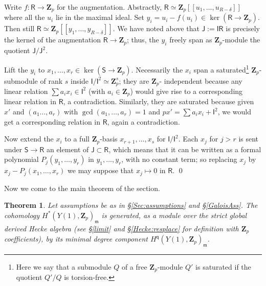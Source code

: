 \documentclass[10pt]{amsart}
\newcommand{\Z}{\mathbf{Z}}
\newcommand{\Jinf}{\mathsf{J}}
\newcommand{\Sinf}{\mathsf{S}}
\newcommand{\Iinf}{\mathsf{I}}
\newcommand{\Rinf}{\mathsf{R}}
\newtheorem{theorem}[subsection]{Theorem}
\theoremstyle{remark}
\newcommand{\BWq}{\mathsf{q}}
\begin{document}
\proof 
  
 
 Write $f: \Rinf \rightarrow \Z_p$ for the augmentation. 
  Abstractly, $\Rinf \simeq \Z_p[[u_1, \dots, u_{R-{\delta}}]]$ where all the $u_i$ lie in the maximal ideal.  
Set  $y_i = u_i - f(u_i) \in  \ker(\Rinf \rightarrow \Z_p)$. Then still $\Rinf \simeq \Z_p[[y_1, \dots, y_{R-\delta}]]$. 
We have noted above that $\Jinf := \Iinf \Rinf$ is precisely the kernel of the augmentation $\Rinf \rightarrow \Z_p$; thus, 
  the $y_i$ freely span as $\Z_p$-module the quotient $\Jinf/\Jinf^2$.  
 
 Lift the $y_i$ to $x_1, \dots, x_r \in \ker(\Sinf \rightarrow \Z_p)$. 
Necessarily the $x_i$  span a saturated\footnote{Here we say that a submodule $Q$ of a free $\Z_p$-module $Q'$ is saturated if the quotient
$Q'/Q$ is torsion-free.} $\Z_p$-submodule of rank $s$ inside $\Iinf/\Iinf^2 \simeq \Z_p^s$; 
they are $\Z_p$- independent because any linear relation $\sum a_i x_i \in \Iinf^2$ (with $a_i \in \Z_p$) 
would give rise to a corresponding linear relation in $\Rinf$, a contradiction. Similarly, they are saturated because 
given $x'$  and $(a_1 \dots, a_r)$ with $\gcd(a_1, \dots, a_r) =1$ and  $p x' = \sum a_i x_i + \Iinf^2$, we would get a corresponding relation in $\Rinf$, again a contradiction. 

Now  extend  the $x_i$ to a full $\Z_p$-basis
$x_{r+1}, \dots, x_s$ for $\Iinf/\Iinf^2$.  Each $x_j$ for $j > r$
is sent under $\Sinf \rightarrow \Rinf$ an element of $\Jinf \subset \Rinf$, which means that it can be written
as a formal polynomial  $P_j(y_1, \dots, y_r)$ in  $y_1, \dots, y_r$, with no constant term; so  replacing $x_j$ by $x_j - P_j(x_1, \dots, x_r)$ we may  suppose that $x_j \mapsto 0$ in $\Rinf$. 
\qed 

%
%
%
%
%
%
%
%
%
%
%
%
%
 

%
%
%
%
%
%
%
%
%
%
%
%
%
%
 

%
%
%
%
%
%
%
%
%
%
%
%
%
%
%
%
 
 
 
%
%
%
%
%
%
%
%
%
%
%


Now we come to the main theorem of the section.  

\begin{theorem}  \label{mindegreeproof} 
Let assumptions be as in \S \ref{Sec:assumptions}
and \S \ref{GaloisAss}. 
The cohomology  $H^*(Y(1), \Z_p)_{\mathfrak{m}}$
  is generated, as a module over the strict global derived Hecke algebra (see \S \ref{limit} and \S \ref{Hecke:resplace} for definition with $\Z_p$ coefficients), by its minimal degree component $H^{\BWq}(Y(1), \Z_p)_{\mathfrak{m}}$.
 \end{theorem}
 
\end{document}
